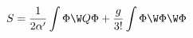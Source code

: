 \begin{equation}
	S=\frac{1}{2\alpha'}\int \Phi \W Q\Phi +\frac{g}{3!}\int \Phi\W\Phi\W\Phi
\end{equation}

